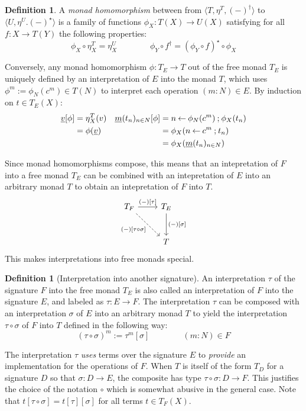 \documentclass[11pt,oneside,draft]{book}
\theoremstyle{definition}
\newtheorem{definition}[theorem]{Definition}
\newcommand{\ul}[1]{%
  \underline{\smash{#1}}
}
\begin{document}
\begin{definition} \label{def:setmonhom}
A \emph{monad homomorphism} between
from $\langle T, \eta^T, (-)^\dagger \rangle$
to $\langle U, \eta^U. (-)^\star \rangle$
is a family of functions
$\phi_X : T(X) \rightarrow U(X)$
satisfying
for all $f : X \rightarrow T(Y)$
the following properties:
\[
  \phi_X \circ \eta^T_X = \eta^U_X
  \qquad \qquad
  \phi_Y \circ f^\dagger = (\phi_Y \circ f)^\star \circ \phi_X
\]
\end{definition}

Conversely,
any monad homomorphism $\phi : T_E \rightarrow T$
out of the free monad $T_E$
is uniquely defined by an interpretation of $E$
into the monad $T$,
which uses $\phi^m := \phi_N(c^m) \in T(N)$
to interpret each operation $(m \mathbin: N) \in E$.
By induction on $t \in T_E(X)$:
\begin{align*}
  \ul{v}[\phi] &= \eta^T_X(v) &
  \ul{m}(t_n)_{n \in N} [\phi]
    &= n \mathbin\leftarrow \phi_N(c^m) \mathbin; \phi_X(t_n)
  \\
    &= \phi(\ul{v}) &
    &= \phi_X(n \mathbin\leftarrow c^m \mathbin; t_n)
  \\
    &&
    &= \phi_X(\ul{m}(t_n)_{n \in N})
\end{align*}

Since monad homomorphisms compose,
this means that
an intepretation of $F$ into a free monad $T_E$
can be combined with an intepretation of $E$ into
an arbitrary monad $T$
to obtain an intepretation of $F$ into $T$.
\[
  \begin{tikzcd}[row sep=large]
    T_F \ar[r, "{(-)[\tau]}"] \ar[dr, dashed, "{(-)[\tau \circ \sigma]}"'] &
    T_E \ar[d, "{(-)[\sigma]}"] \\
    & T
  \end{tikzcd}
\]
This makes interpretations into free monads special.

\begin{definition}[Interpretation into another signature]
An interpretation $\tau$ of the signature $F$
into the free monad $T_E$
is also called an interpretation of $F$ into the signature $E$,
and labeled as $\tau : E \rightarrow F$.
The interpretation $\tau$ can be composed with
an interpretation $\sigma$ of $E$ into an arbitrary monad $T$
to yield the interpretation $\tau \circ \sigma$
of $F$ into $T$ defined in the following way:
\[
  (\tau \circ \sigma)^m := \tau^m[\sigma]
  \qquad \qquad
  (m \mathbin: N) \in F
\]
\end{definition}

The interpretation $\tau$ \emph{uses}
terms over the signature $E$
to \emph{provide} an implementation for the operations of $F$.
When $T$ is itself of the form $T_D$ for a signature $D$
so that $\sigma : D \rightarrow E$,
the composite has type $\tau \circ \sigma : D \rightarrow F$.
This justifies the choice of the notation $\circ$
which is somewhat abusive in the general case.
Note that $t[\tau \circ \sigma] = t[\tau][\sigma]$
for all terms $t \in T_F(X)$.
\end{document}
